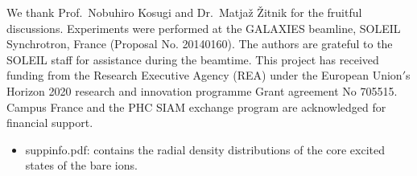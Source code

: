 \documentclass[journal=jacsat,manuscript=article]{achemso}
\begin{document}
\begin{acknowledgement}


We thank Prof.\ Nobuhiro Kosugi and Dr.\ Matja\v{z} \v{Z}itnik for the fruitful discussions. Experiments were performed at the GALAXIES beamline, SOLEIL Synchrotron, France (Proposal No. 20140160). The authors are grateful to the SOLEIL staff for assistance during the beamtime. This project has received funding from the Research Executive Agency (REA) under the European Union$'$s Horizon 2020 research and innovation programme Grant agreement No 705515. Campus France and the PHC SIAM exchange program are acknowledged for financial support.

\end{acknowledgement}

\begin{suppinfo}

\begin{itemize}
  \item suppinfo.pdf: contains the radial density distributions of the core excited states of the bare ions.
\end{itemize}

\end{suppinfo}


%
\end{document}
